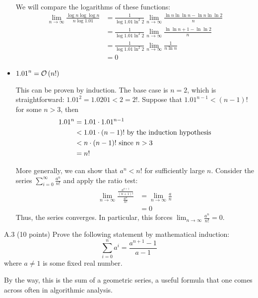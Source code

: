 \documentclass[final]{article}
\begin{document}
\begin{solution}
\begin{itemize}
              We will compare the logarithms of these functions:
              \begin{align*}\lim_{n\to\infty}\frac{\log{n}\log\log{n}}{n\log{1.01}}
                   & = \frac{1}{\log{1.01}\ln^2{2}}\lim_{n\to\infty}\frac{\ln{n}\ln\ln{n} - \ln{n}\ln\ln{2}}{n} \\
                   & = \frac{1}{\log{1.01}\ln^2{2}}\lim_{n\to\infty}\frac{\ln\ln{n} + 1 - \ln\ln{2}}{n}         \\
                   & = \frac{1}{\log{1.01}\ln^2{2}}\lim_{n\to\infty}\frac{1}{n\ln{n}}                           \\
                   & = 0
              \end{align*}

        \item $\displaystyle {1.01}^n = \mathcal{O}\left(n!\right)$

              This can be proven by induction. The base case is $n = 2$, which is straightforward: $1.01^2 = 1.0201 < 2 = 2!$. Suppose that ${1.01}^{n - 1} < (n - 1)!$ for some $n > 3$, then
              \begin{align*}{1.01}^n
                   & = 1.01 \cdot {1.01}^{n - 1}                               \\
                   & < 1.01 \cdot (n - 1)! \hbox{ by the induction hypothesis} \\
                   & < n \cdot (n - 1)! \hbox{ since $n > 3$}                  \\
                   & = n!
              \end{align*}

              More generally, we can show that $a^n < n!$ for sufficiently large $n$. Consider the series $\sum_{i=0}^{\infty}\frac{a^n}{n!}$ and apply the ratio test:
              \begin{align*}\lim_{n\to\infty}\frac{\frac{a^{n + 1}}{(n + 1)!}}{\frac{a^n}{n!}}
                   & = \lim_{n\to\infty}\frac{a}{n} \\
                   & = 0
              \end{align*}
              Thus, the series converges. In particular, this forces $\lim_{n\to\infty}\frac{a^n}{n!} = 0$.
    \end{itemize}
\end{solution}

\begin{exercise}{A.3} (10 points)
    Prove the following statement by mathematical induction:
    \[\sum_{i=0}^n a^i = \frac{a^{n+1} - 1}{a-1}\] where $a \neq 1$
    is some fixed real number.

    By the way, this is the sum of a geometric series, a useful
    formula that one comes across often in algorithmic analysis.
\end{exercise}
\end{document}
